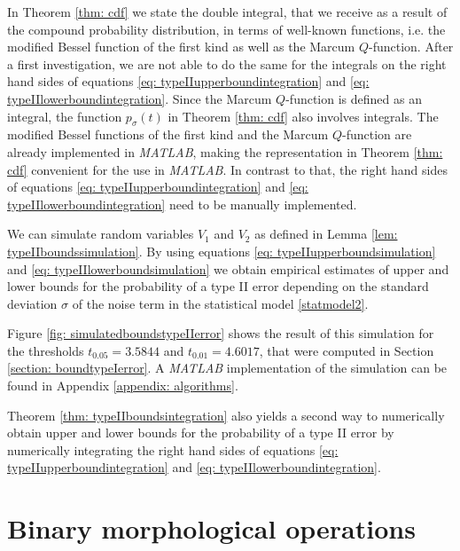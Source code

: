 \documentclass[a4paper,12pt]{article}
\theoremstyle{plain}
\theoremstyle{definition}
\numberwithin{equation}{section}
\begin{document}
In Theorem \ref{thm: cdf} we state the double integral, that we receive as a result of the compound probability distribution, in terms of well-known functions, i.e. the modified Bessel function of the first kind as well as the Marcum $Q$-function. After a first investigation, we are not able to do the same for the integrals on the right hand sides of equations \eqref{eq: typeIIupperboundintegration} and \eqref{eq: typeIIlowerboundintegration}. Since the Marcum $Q$-function is defined as an integral, the function $p_\sigma(t)$ in Theorem \ref{thm: cdf} also involves integrals. The modified Bessel functions of the first kind and the Marcum $Q$-function are already implemented in \emph{MATLAB}, making the representation in Theorem \ref{thm: cdf} convenient for the use in \emph{MATLAB}. In contrast to that, the right hand sides of equations \eqref{eq: typeIIupperboundintegration} and \eqref{eq: typeIIlowerboundintegration} need to be manually implemented.

We can simulate random variables $V_1$ and $V_2$ as defined in Lemma \ref{lem: typeIIboundssimulation}. By using equations \eqref{eq: typeIIupperboundsimulation} and \eqref{eq: typeIIlowerboundsimulation} we obtain empirical estimates of upper and lower bounds for the probability of a type II error depending on the standard deviation $\sigma$ of the noise term in the statistical model \eqref{statmodel2}.

Figure \ref{fig: simulatedboundstypeIIerror} shows the result of this simulation for the thresholds $t_{0.05} = 3.5844$ and $t_{0.01} = 4.6017$, that were computed in Section \ref{section: boundtypeIerror}. A \emph{MATLAB} implementation of the simulation can be found in Appendix \ref{appendix: algorithms}.



Theorem \ref{thm: typeIIboundsintegration} also yields a second way to numerically obtain upper and lower bounds for the probability of a type II error by numerically integrating the right hand sides of equations \eqref{eq: typeIIupperboundintegration} and \eqref{eq: typeIIlowerboundintegration}.

\newpage



\section{Binary morphological operations}\label{section: morphologicaloperations}
\end{document}
